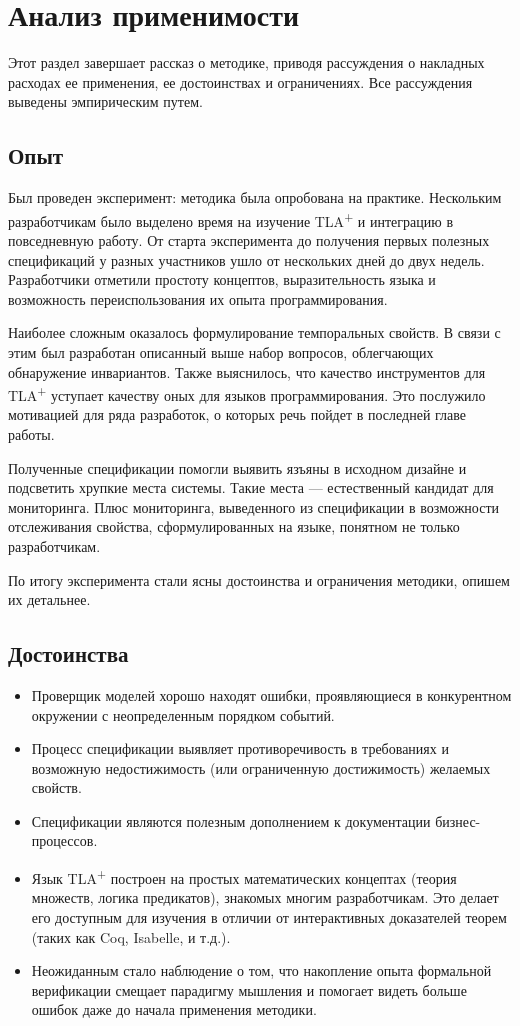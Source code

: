\documentclass[14pt, openany]{book}
\newcommand{\tlapl}{TLA\textsuperscript{+} }
\begin{document}
\section{Анализ применимости}
Этот раздел завершает рассказ о методике, приводя рассуждения о накладных расходах ее применения, ее достоинствах и ограничениях.
Все рассуждения выведены эмпирическим путем.

\subsection{Опыт}
Был проведен эксперимент: методика была опробована на практике. Нескольким разработчикам было выделено время на изучение \tlapl и интеграцию в повседневную работу. От старта эксперимента до получения первых полезных спецификаций у разных участников ушло от нескольких дней до двух недель. Разработчики отметили простоту концептов, выразительность языка и возможность переиспользования их опыта программирования. 

Наиболее сложным оказалось формулирование темпоральных свойств. В связи с этим был разработан описанный выше набор вопросов, облегчающих обнаружение инвариантов. Также выяснилось, что качество инструментов для \tlapl уступает качеству оных для языков программирования. Это послужило мотивацией для ряда разработок, о которых речь пойдет в последней главе работы.

Полученные спецификации помогли выявить язъяны в исходном дизайне и подсветить хрупкие места системы. Такие места --- естественный кандидат для мониторинга. Плюс мониторинга, выведенного из спецификации в возможности отслеживания свойства, сформулированных на языке, понятном не только разработчикам.

По итогу эксперимента стали ясны достоинства и ограничения методики, опишем их детальнее.

\subsection{Достоинства}
\begin{itemize}
  \item Проверщик моделей хорошо находят ошибки, проявляющиеся в конкурентном окружении с неопределенным порядком событий.
  \item Процесс спецификации выявляет противоречивость в требованиях и возможную недостижимость (или ограниченную достижимость) желаемых свойств.
  \item Спецификации являются полезным дополнением к документации бизнес-процессов.
  \item Язык \tlapl построен на простых математических концептах (теория множеств, логика предикатов), знакомых многим разработчикам. Это делает его доступным для изучения в отличии от интерактивных доказателей теорем (таких как Coq, Isabelle, и т.д.).
  \item Неожиданным стало наблюдение о том, что накопление опыта формальной верификации смещает парадигму мышления и помогает видеть больше ошибок даже до начала применения методики.
\end{itemize}
\end{document}
